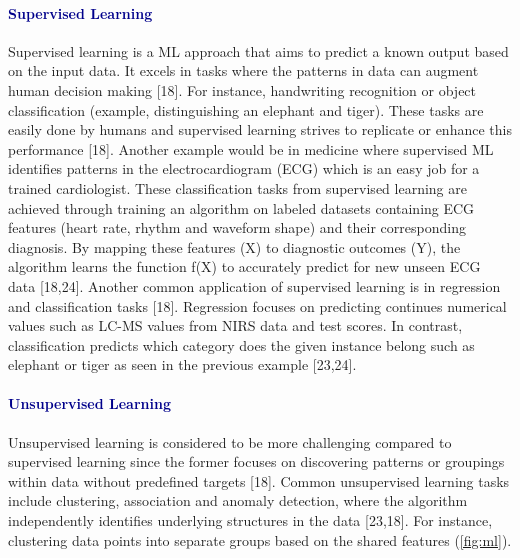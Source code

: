 \documentclass[12pt,a4paper]{report}
\begin{document}
\paragraph{\textcolor{darkblue}{Supervised Learning}} 
Supervised learning is a ML approach that aims to predict a known output  based on the input data. It excels in tasks where the patterns in data can augment human decision making [18]. 
For instance, handwriting recognition or object classification (example, distinguishing an elephant and tiger). These tasks are easily done by humans and supervised learning strives to replicate 
or enhance this performance [18]. Another example would be in medicine where supervised ML identifies patterns in the electrocardiogram (ECG) which is an easy job for a trained cardiologist. 
These classification tasks from supervised learning are achieved through training an algorithm on labeled datasets containing ECG features (heart rate, rhythm and waveform shape) and their corresponding diagnosis. 
By mapping these features (X) to diagnostic outcomes (Y), the algorithm learns the function f(X) to accurately predict for new unseen ECG data [18,24]. Another common application of supervised learning is in regression and classification tasks [18]. 
Regression focuses on predicting continues numerical values such as LC-MS values from NIRS data and test scores. In contrast, classification predicts which category does the given instance belong such as elephant or tiger as seen in the previous example [23,24]. \\

\paragraph{\textcolor{darkblue}{Unsupervised Learning}} 
Unsupervised learning is considered to be more challenging compared to supervised learning since the former focuses on discovering patterns or groupings within data without predefined targets [18]. Common unsupervised learning tasks include clustering, association and anomaly detection, where the algorithm independently identifies underlying structures in the data [23,18].
For instance, clustering data points into separate groups based on the shared features (\ref{fig:ml}). 
\end{document}
